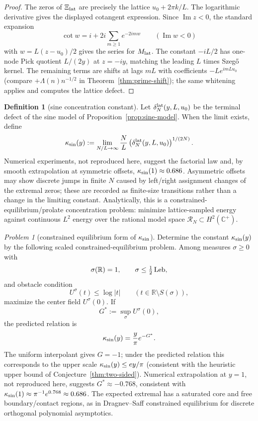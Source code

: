 \documentclass[11pt]{amsart}
\theoremstyle{definition}
\newtheorem{definition}[theorem]{Definition}
\theoremstyle{remark}
\newtheorem{problem}[theorem]{Problem}
\theoremstyle{definition}
\renewcommand{\Im}{\operatorname{Im}}
\newcommand{\R}{\mathbb{R}}
\newcommand{\C}{\mathbb{C}}
\begin{document}
\begin{proof}
The zeros of $\Xi_{\rm lat}$ are precisely the lattice
$u_0+2\pi k/L$.  The logarithmic derivative gives the displayed cotangent expression.  Since
$\Im z<0$, the standard expansion
\[
   \cot w=i+2i\sum_{m\ge1}e^{-2imw}
   \qquad(\Im w<0)
\]
with $w=L(z-u_0)/2$ gives the series for $M_{\rm lat}$.  The constant $-iL/2$ has one-node Pick
quotient $L/(2y)$ at $z=-iy$, matching the leading $L$ times Szeg\H{o} kernel.  The remaining terms
are shifts at lags $mL$ with coefficients $-Le^{imLu_0}$ (compare $+\Lambda(n)n^{-1/2}$ in
Theorem~\ref{thm:prime-shift}); the same whitening applies and computes the lattice defect.
\end{proof}

\begin{definition}[sine concentration constant]\label{def:kappa-sine}
Let $\delta_N^{\rm lat}(y,L,u_0)$ be the terminal defect of the sine model of
Proposition~\ref{prop:sine-model}.  When the limit exists, define
\[
   \kappa_{\rm sin}(y)
   :=
   \lim_{N/L\to\infty}
   \frac NL
   \left(\delta_N^{\rm lat}(y,L,u_0)\right)^{1/(2N)}.
\]
Numerical experiments, not reproduced here, suggest the factorial law and, by smooth extrapolation
at symmetric offsets, $\kappa_{\rm sin}(1)\approx0.686$.  Asymmetric offsets may show discrete jumps in finite $N$ caused by left/right assignment changes of the
extremal zeros; these are recorded as finite-size transitions rather than a change in the limiting
constant.
Analytically, this is a constrained-equilibrium/prolate concentration problem: minimize
lattice-sampled energy against continuous $L^2$ energy over the rational model space
$\mathcal R_N\subset H^2(\C^+)$.
\end{definition}

\begin{problem}[constrained equilibrium form of $\kappa_{\rm sin}$]\label{prob:kappa-final}
Determine the constant $\kappa_{\rm sin}(y)$ by the following scaled constrained-equilibrium problem.
Among measures $\sigma\ge0$ with
\[
   \sigma(\R)=1,\qquad \sigma\le\tfrac12\,{\rm Leb},
\]
and obstacle condition
\[
   U^\sigma(t)\le\log|t|\qquad (t\in\R\setminus S(\sigma)),
\]
maximize the center field $U^\sigma(0)$.  If
\[
   G^*:=\sup_\sigma U^\sigma(0),
\]
the predicted relation is
\[
   \kappa_{\rm sin}(y)=\frac y\pi e^{-G^*}.
\]
The uniform interpolant gives $G=-1$; under the predicted relation this corresponds to the upper scale
$\kappa_{\rm sin}(y)\le ey/\pi$ (consistent with the heuristic upper bound of
Conjecture~\ref{thm:two-sided}).  Numerical extrapolation at $y=1$, not reproduced here, suggests
$G^*\approx-0.768$, consistent with $\kappa_{\rm sin}(1)\approx\pi^{-1}e^{0.768}\approx0.686$.  The expected extremal has a saturated core and free boundary/contact regions,
as in Dragnev--Saff constrained equilibrium for discrete orthogonal polynomial asymptotics.
\end{problem}
\end{document}
